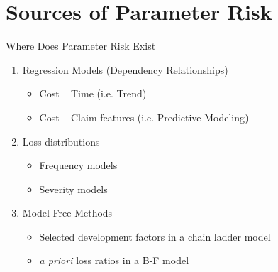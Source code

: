 \documentclass[10pt, xcolor=x11names,compress]{beamer}
\begin{document}
\section{Sources of Parameter Risk}
\begin{frame}{Where Does Parameter Risk Exist}
	\begin{enumerate}
		\item<1-> Regression Models (Dependency Relationships)
			\begin{itemize}
				\item<1-> Cost ~ Time (i.e. Trend)
				\item<1-> Cost ~ Claim features (i.e. Predictive Modeling)
			\end{itemize}
		\item<2-> Loss distributions
			\begin{itemize}
				\item<2-> Frequency models
				\item<2-> Severity models
			\end{itemize}
		\item<3-> Model Free Methods
		\begin{itemize}
			\item<2-> Selected development factors in a chain ladder model
			\item<2-> \textit{a priori} loss ratios in a B-F model
		\end{itemize}		
	\end{enumerate}
\end{frame}

\end{document}
